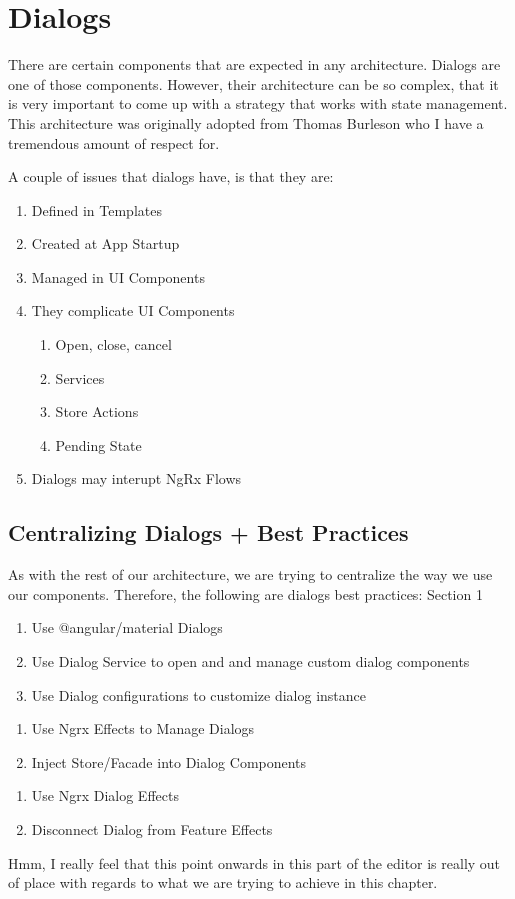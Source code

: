 \maketitle{}
\section{ Dialogs }

There are certain components that are expected in any architecture. Dialogs are
one of those components. However, their architecture can be so complex, that it
is very important to come up with a strategy that works with state management.
This architecture was originally adopted from Thomas Burleson who I have a
tremendous amount of respect for.

A couple of issues that dialogs have, is that they are:
\begin{enumerate}
  \item Defined in Templates
  \item Created at App Startup
  \item Managed in UI Components
  \item They complicate UI Components
    \begin{enumerate}
      \item Open, close, cancel
      \item Services
      \item Store Actions
      \item Pending State
    \end{enumerate}
  \item Dialogs may interupt NgRx Flows
\end{enumerate}

\subsection{ Centralizing Dialogs + Best Practices}
As with the rest of our architecture, we are trying to centralize the way we
use our components. Therefore, the following are dialogs best practices:
Section 1
\begin{enumerate}
  \item Use @angular/material Dialogs
  \item Use Dialog Service to open and and manage custom dialog components
  \item Use Dialog configurations to customize dialog instance
\end{enumerate}
\begin{enumerate}
  \item Use Ngrx Effects to Manage Dialogs
  \item Inject Store/Facade into Dialog Components
\end{enumerate}

\begin{enumerate}
  \item Use Ngrx Dialog Effects
  \item Disconnect Dialog from Feature Effects
\end{enumerate}

Hmm, I really feel that this point onwards in this part of the editor is really
out of place with regards to what we are trying to achieve in this chapter. 
